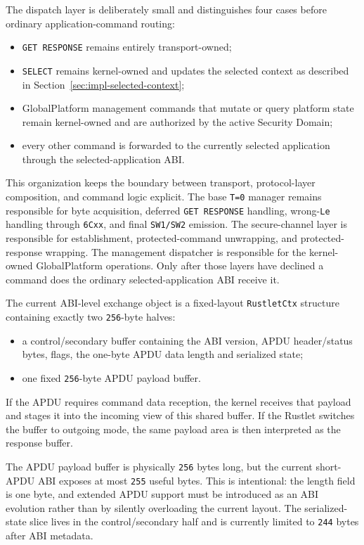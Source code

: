 The dispatch layer is deliberately small and distinguishes four cases before
ordinary application-command routing:
\begin{itemize}
\item \texttt{GET RESPONSE} remains entirely transport-owned;
\item \texttt{SELECT} remains kernel-owned and updates the selected
  context as described in Section~\ref{sec:impl-selected-context};
\item GlobalPlatform management commands that mutate or query platform state
  remain kernel-owned and are authorized by the active Security Domain;
\item every other command is forwarded to the currently selected application
  through the selected-application ABI.
\end{itemize}

This organization keeps the boundary between transport, protocol-layer
composition, and command logic explicit. The base \texttt{T=0} manager
remains responsible for byte acquisition, deferred \texttt{GET RESPONSE}
handling, wrong-\texttt{Le} handling through \texttt{6Cxx}, and final
\texttt{SW1/SW2} emission. The secure-channel layer is responsible for
establishment, protected-command unwrapping, and protected-response wrapping.
The management dispatcher is responsible for the kernel-owned GlobalPlatform
operations. Only after those layers have declined a command does the ordinary
selected-application ABI receive it.

The current ABI-level exchange object is a fixed-layout
\texttt{RustletCtx} structure containing exactly two \texttt{256}-byte halves:
\begin{itemize}
\item a control/secondary buffer containing the ABI version, APDU
  header/status bytes, flags, the one-byte APDU data length and serialized
  state;
\item one fixed \texttt{256}-byte APDU payload buffer.
\end{itemize}

If the APDU requires command data reception, the kernel receives that
payload and stages it into the incoming view of this shared buffer. If
the Rustlet switches the buffer to outgoing mode, the same payload area
is then interpreted as the response buffer.

The APDU payload buffer is physically \texttt{256} bytes long, but the current
short-APDU ABI exposes at most \texttt{255} useful bytes. This is intentional:
the length field is one byte, and extended APDU support must be introduced as
an ABI evolution rather than by silently overloading the current layout. The
serialized-state slice lives in the control/secondary half and is currently
limited to \texttt{244} bytes after ABI metadata.

